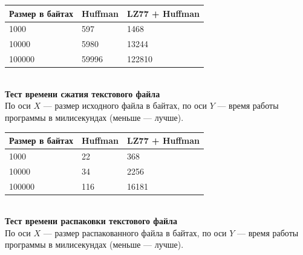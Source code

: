 \documentclass[12pt]{article}
\begin{document}
    \begin{tabular}{ | l | l | l | }
        \hline
            Размер в байтах & Huffman & LZ77 + Huffman \\ \hline
            1000            & 597     & 1468           \\
            10000           & 5980    & 13244          \\
            100000          & 59996   & 122810         \\
        \hline
    \end{tabular} \\

    \textbf{Тест времени сжатия текстового файла} \\
    По оси $X$ — размер исходного файла в байтах, по оси $Y$ — время работы 
    программы в милисекундах (меньше — лучше).


    \begin{tabular}{ | l | l | l | }
        \hline
            Размер в байтах & Huffman & LZ77 + Huffman \\ \hline
            1000            & 22      & 368            \\
            10000           & 34      & 2256           \\
            100000          & 116     & 16181          \\
        \hline
    \end{tabular} \\

    \textbf{Тест времени распаковки текстового файла} \\
    По оси $X$ — размер распакованного файла в байтах, по оси $Y$ — время 
    работы программы в милисекундах (меньше — лучше).

\end{document}
